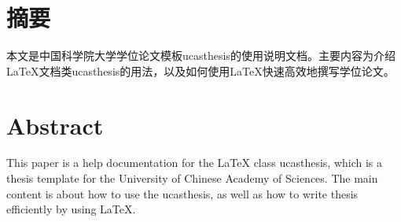 \maketitle%
\MAKETITLE%
\makedeclaration%
\intobmk\chapter*{摘\quad 要}%
\setcounter{page}{1}%

本文是中国科学院大学学位论文模板ucasthesis的使用说明文档。主要内容为介绍\LaTeX{}文档类ucasthesis的用法，以及如何使用\LaTeX{}快速高效地撰写学位论文。

\intobmk\chapter*{Abstract}%

This paper is a help documentation for the \LaTeX{} class ucasthesis, which is  a thesis template for the University of Chinese Academy of Sciences. The main content is about how to use the ucasthesis, as well as how to write thesis efficiently by using \LaTeX{}.

